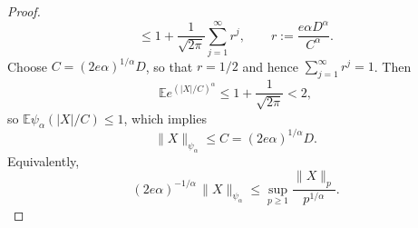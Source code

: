 \documentclass[12pt]{article}
\renewcommand{\(}{\left(}%
\renewcommand{\)}{\right)}%
\renewcommand{\[}{\left[}%
\renewcommand{\]}{\right]}%
\newtheorem{proof}{Proof.}}
\begin{document}
\begin{proof}
\begin{equation*}
\le 1+\frac{1}{\sqrt{2\pi}}\sum_{j=1}^\infty r^j,
\qquad
r:=\frac{e\alpha D^\alpha}{C^\alpha}.
\end{equation*}
Choose $C=(2e\alpha)^{1/\alpha}D$, so that $r=1/2$ and hence $\sum_{j=1}^\infty r^j=1$. Then
\begin{equation*}
\mathbb{E}e^{(|X|/C)^\alpha}\le 1+\frac{1}{\sqrt{2\pi}}<2,
\end{equation*}
so $\mathbb{E}\psi_\alpha(|X|/C)\le 1$, which implies
\begin{equation*}
\|X\|_{\psi_\alpha}\le C=(2e\alpha)^{1/\alpha}D.
\end{equation*}
Equivalently,
\begin{equation*}
(2e\alpha)^{-1/\alpha}\,\|X\|_{\psi_\alpha}
\le
\sup_{p\ge 1}\frac{\|X\|_p}{p^{1/\alpha}}.
\end{equation*}


\end{proof}
\end{document}
